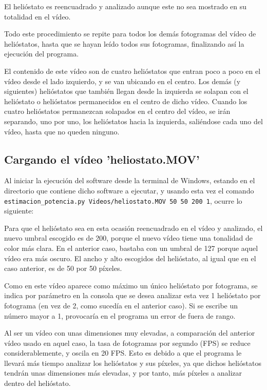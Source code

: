 El helióstato es reencuadrado y analizado aunque este no sea mostrado en su totalidad en el vídeo.

Todo este procedimiento se repite para todos los demás fotogramas del vídeo de helióstatos, hasta que se hayan leído todos sus fotogramas, finalizando así la ejecución del programa.

El contenido de este vídeo son de cuatro helióstatos que entran poco a poco en el vídeo desde el lado izquierdo, y se van ubicando en el centro. Los demás (y siguientes) helióstatos que también llegan desde la izquierda se solapan con el helióstato o helióstatos permanecidos en el centro de dicho vídeo. Cuando los cuatro helióstatos permanezcan solapados en el centro del vídeo, se irán separando, uno por uno, los helióstatos hacia la izquierda, saliéndose cada uno del vídeo, hasta que no queden ninguno.

\subsection{Cargando el vídeo 'heliostato.MOV'}

Al iniciar la ejecución del software desde la terminal de Windows, estando en el directorio que contiene dicho software a ejecutar, y usando esta vez el comando\\ \verb|estimacion_potencia.py Videos/heliostato.MOV 50 50 200 1|, ocurre lo siguiente:

Para que el helióstato sea en esta ocasión reencuadrado en el vídeo y analizado, el nuevo umbral escogido es de 200, porque el nuevo vídeo tiene una tonalidad de color más clara. En el anterior caso, bastaba con un umbral de 127 porque aquel vídeo era más oscuro. El ancho y alto escogidos del helióstato, al igual que en el caso anterior, es de 50 por 50 píxeles.

Como en este vídeo aparece como máximo un único helióstato por fotograma, se indica por parámetro en la consola que se desea analizar esta vez 1 helióstato por fotograma (en vez de 2, como sucedía en el anterior caso). Si se escribe un número mayor a 1, provocaría en el programa un error de fuera de rango.

Al ser un vídeo con unas dimensiones muy elevadas, a comparación del anterior vídeo usado en aquel caso, la tasa de fotogramas por segundo (FPS) se reduce considerablemente, y oscila en 20 FPS. Esto es debido a que el programa le llevará más tiempo analizar los helióstatos y sus píxeles, ya que dichos helióstatos tendrán unas dimensiones más elevadas, y por tanto, más píxeles a analizar dentro del helióstato.

